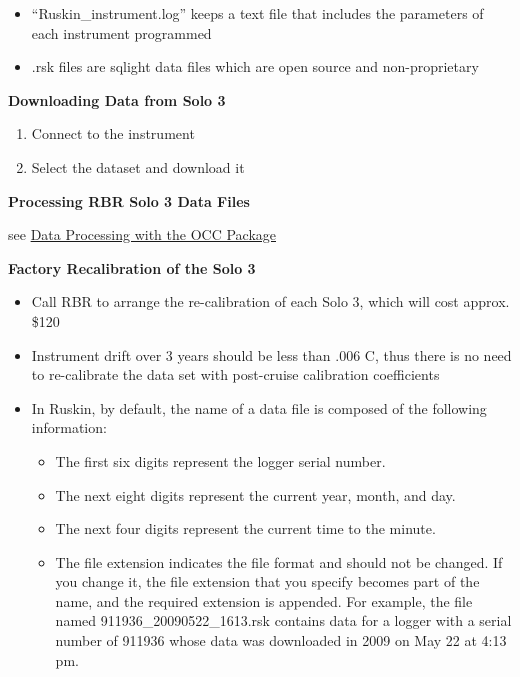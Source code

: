 \documentclass[]{book}
\providecommand{\tightlist}{%
  \setlength{\itemsep}{0pt}\setlength{\parskip}{0pt}}
\begin{document}
\begin{itemize}
\item
  ``Ruskin\_instrument.log'' keeps a text file that includes the parameters of each instrument programmed
\item
  .rsk files are sqlight data files which are open source and non-proprietary
\end{itemize}

\textbf{Downloading Data from Solo 3}

\begin{enumerate}
\def\labelenumi{\arabic{enumi}.}
\item
  Connect to the instrument
\item
  Select the dataset and download it
\end{enumerate}

\textbf{Processing RBR Solo 3 Data Files}

see \protect\hyperlink{data_processing}{Data Processing with the OCC Package}

\textbf{Factory Recalibration of the Solo 3}

\begin{itemize}
\item
  Call RBR to arrange the re-calibration of each Solo 3, which will cost approx. \$120
\item
  Instrument drift over 3 years should be less than .006 C, thus there is no need to re-calibrate the data set with post-cruise calibration coefficients
\item
  In Ruskin, by default, the name of a data file is composed of the following information:

  \begin{itemize}
  \tightlist
  \item
    The first six digits represent the logger serial number.
  \item
    The next eight digits represent the current year, month, and day.
  \item
    The next four digits represent the current time to the minute.
  \item
    The file extension indicates the file format and should not be changed. If you change it, the file extension that you specify becomes part of the name, and the required extension is appended. For example, the file named 911936\_20090522\_1613.rsk contains data for a logger with a serial number of 911936 whose data was downloaded in 2009 on May 22 at 4:13 pm.
  \end{itemize}
\end{itemize}
\end{document}
